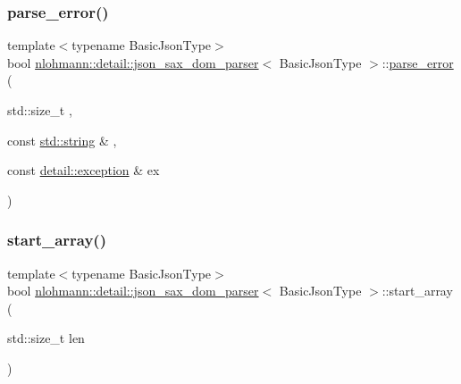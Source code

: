 \mbox{\label{classnlohmann_1_1detail_1_1json__sax__dom__parser_a7d3bf1f361ebb817c694ba45b3814fa6}} 
\subsubsection{\texorpdfstring{parse\_error()}{parse\_error()}}
{\footnotesize\ttfamily template$<$typename Basic\+Json\+Type$>$ \\
bool \mbox{\hyperlink{classnlohmann_1_1detail_1_1json__sax__dom__parser}{nlohmann\+::detail\+::json\+\_\+sax\+\_\+dom\+\_\+parser}}$<$ Basic\+Json\+Type $>$\+::\mbox{\hyperlink{classnlohmann_1_1detail_1_1parse__error}{parse\+\_\+error}} (\begin{DoxyParamCaption}\item[{std\+::size\+\_\+t}]{,  }\item[{const \mbox{\hyperlink{namespacenlohmann_1_1detail_a1ed8fc6239da25abcaf681d30ace4985ab45cffe084dd3d20d928bee85e7b0f21}{std\+::string}} \&}]{,  }\item[{const \mbox{\hyperlink{classnlohmann_1_1detail_1_1exception}{detail\+::exception}} \&}]{ex }\end{DoxyParamCaption})\hspace{0.3cm}{\ttfamily [inline]}}

\mbox{\label{classnlohmann_1_1detail_1_1json__sax__dom__parser_a056b895d011efaf48ea096c024aca0d4}} 
\subsubsection{\texorpdfstring{start\_array()}{start\_array()}}
{\footnotesize\ttfamily template$<$typename Basic\+Json\+Type$>$ \\
bool \mbox{\hyperlink{classnlohmann_1_1detail_1_1json__sax__dom__parser}{nlohmann\+::detail\+::json\+\_\+sax\+\_\+dom\+\_\+parser}}$<$ Basic\+Json\+Type $>$\+::start\+\_\+array (\begin{DoxyParamCaption}\item[{std\+::size\+\_\+t}]{len }\end{DoxyParamCaption})\hspace{0.3cm}{\ttfamily [inline]}}

